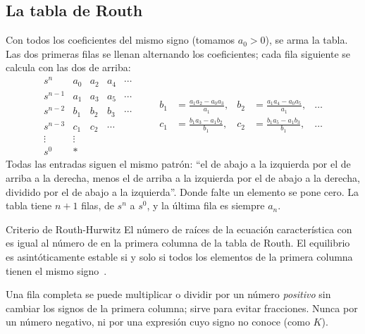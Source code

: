 \subsection*{La tabla de Routh}

Con todos los coeficientes del mismo signo (tomamos $a_0>0$), se arma la tabla. Las dos primeras filas se llenan alternando los coeficientes; cada fila siguiente se calcula con las dos de arriba:
\[
\begin{array}{c|cccc}
  s^n     & a_0 & a_2 & a_4 & \cdots\\
  s^{n-1} & a_1 & a_3 & a_5 & \cdots\\
  s^{n-2} & b_1 & b_2 & b_3 & \cdots\\
  s^{n-3} & c_1 & c_2 & \cdots\\
  \vdots  & \vdots\\
  s^0     & \ast
\end{array}
\qquad
\begin{aligned}
  b_1&=\frac{a_1a_2-a_0a_3}{a_1}, & b_2&=\frac{a_1a_4-a_0a_5}{a_1}, & \dots\\[3pt]
  c_1&=\frac{b_1a_3-a_1b_2}{b_1}, & c_2&=\frac{b_1a_5-a_1b_3}{b_1}, & \dots
\end{aligned}
\]
Todas las entradas siguen el mismo patrón: ``el de abajo a la izquierda por el de arriba a la derecha, menos el de arriba a la izquierda por el de abajo a la derecha, dividido por el de abajo a la izquierda''. Donde falte un elemento se pone cero. La tabla tiene $n+1$ filas, de $s^n$ a $s^0$, y la última fila es siempre $a_n$.

\begin{definicion}[label=def:es-routh]{Criterio de Routh-Hurwitz}
El número de raíces de la ecuación característica con  es igual al número de  en la primera columna de la tabla de Routh. El equilibrio es asintóticamente estable si y solo si todos los elementos de la primera columna tienen el mismo signo~\citep{Rou77,Hur95}.
\end{definicion}

\begin{cuidado}
Una fila completa se puede multiplicar o dividir por un número \emph{positivo} sin cambiar los signos de la primera columna; sirve para evitar fracciones. Nunca por un número negativo, ni por una expresión cuyo signo no conoce (como $K$).
\end{cuidado}

